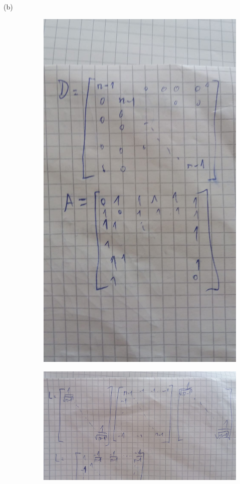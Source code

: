 \documentclass[14pt]{article}
\begin{document}
\begin{description}
\item[(b)]
\begin{figure}[h]
  \includegraphics[scale=0.2]{a10-ex1-b1.jpeg}
\end{figure}
\begin{figure}[h]
  \includegraphics[scale=0.35, angle=90]{a10-ex1-b2.jpeg}

\end{figure}
\end{description}
\end{document}
